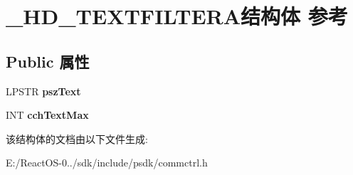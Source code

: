 \hypertarget{struct___h_d___t_e_x_t_f_i_l_t_e_r_a}{}\section{\+\_\+\+H\+D\+\_\+\+T\+E\+X\+T\+F\+I\+L\+T\+E\+R\+A结构体 参考}
\label{struct___h_d___t_e_x_t_f_i_l_t_e_r_a}
\subsection*{Public 属性}
\begin{DoxyCompactItemize}
\item 
\mbox{\label{struct___h_d___t_e_x_t_f_i_l_t_e_r_a_ad01dd49f36b84dd30c63033cfb072758}} 
L\+P\+S\+TR {\bfseries psz\+Text}
\item 
\mbox{\label{struct___h_d___t_e_x_t_f_i_l_t_e_r_a_a7553f257d851bba167fcf5da1dd88643}} 
I\+NT {\bfseries cch\+Text\+Max}
\end{DoxyCompactItemize}


该结构体的文档由以下文件生成\+:\begin{DoxyCompactItemize}
\item 
E\+:/\+React\+O\+S-\/0../sdk/include/psdk/commctrl.\+h\end{DoxyCompactItemize}

